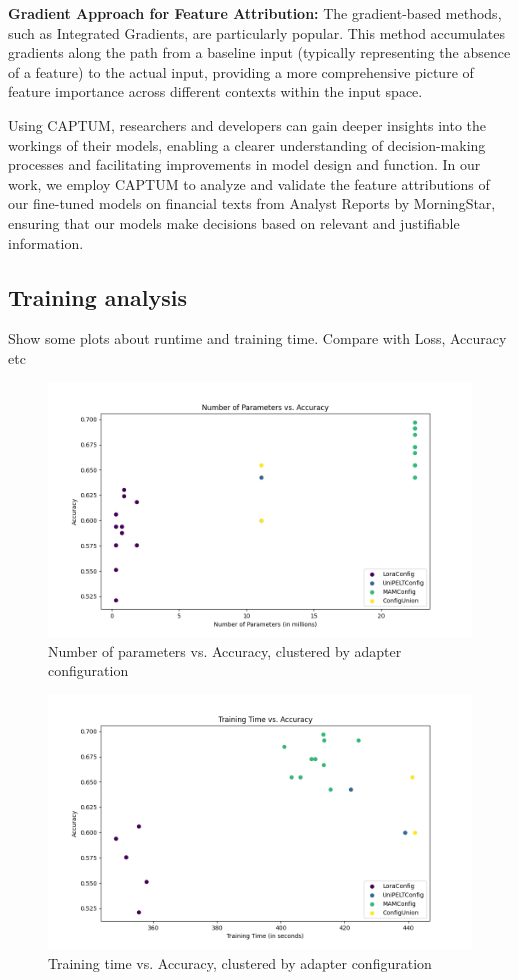 \documentclass[conference]{IEEEtran}
\begin{document}
\textbf{Gradient Approach for Feature Attribution:} The gradient-based methods, such as Integrated Gradients, are particularly popular. This method accumulates gradients along the path from a baseline input (typically representing the absence of a feature) to the actual input, providing a more comprehensive picture of feature importance across different contexts within the input space.

Using CAPTUM, researchers and developers can gain deeper insights into the workings of their models, enabling a clearer understanding of decision-making processes and facilitating improvements in model design and function. In our work, we employ CAPTUM to analyze and validate the feature attributions of our fine-tuned models on financial texts from Analyst Reports by MorningStar, ensuring that our models make decisions based on relevant and justifiable information.



\subsection{Training analysis}%
Show some plots about runtime and training time. Compare with Loss, Accuracy etc

\begin{figure}[!h]
    \centering
    \includegraphics[width=.85\linewidth]{pictures/number_params_vs_accuracy.png}
    \caption{Number of parameters vs. Accuracy, clustered by adapter configuration}
\end{figure}

\begin{figure}[!h]
    \centering
    \includegraphics[width=.85\linewidth]{pictures/training_time_vs_accuracy.png}
    \caption{Training time vs. Accuracy,  clustered by adapter configuration}
\end{figure}
\end{document}
